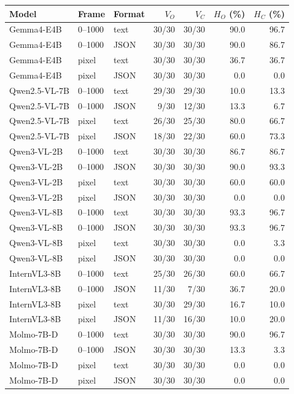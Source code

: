 \begin{tabular}{lllrrrr}
\toprule
Model & Frame & Format & $V_O$ & $V_C$ & $H_O$ (\%) & $H_C$ (\%) \\
\midrule
Gemma4-E4B & 0--1000 & text & 30/30 & 30/30 & 90.0 & 96.7 \\
Gemma4-E4B & 0--1000 & JSON & 30/30 & 30/30 & 90.0 & 86.7 \\
Gemma4-E4B & pixel & text & 30/30 & 30/30 & 36.7 & 36.7 \\
Gemma4-E4B & pixel & JSON & 30/30 & 30/30 & 0.0 & 0.0 \\
Qwen2.5-VL-7B & 0--1000 & text & 29/30 & 29/30 & 10.0 & 13.3 \\
Qwen2.5-VL-7B & 0--1000 & JSON & 9/30 & 12/30 & 13.3 & 6.7 \\
Qwen2.5-VL-7B & pixel & text & 26/30 & 25/30 & 80.0 & 66.7 \\
Qwen2.5-VL-7B & pixel & JSON & 18/30 & 22/30 & 60.0 & 73.3 \\
Qwen3-VL-2B & 0--1000 & text & 30/30 & 30/30 & 86.7 & 86.7 \\
Qwen3-VL-2B & 0--1000 & JSON & 30/30 & 30/30 & 90.0 & 93.3 \\
Qwen3-VL-2B & pixel & text & 30/30 & 30/30 & 60.0 & 60.0 \\
Qwen3-VL-2B & pixel & JSON & 30/30 & 30/30 & 0.0 & 0.0 \\
Qwen3-VL-8B & 0--1000 & text & 30/30 & 30/30 & 93.3 & 96.7 \\
Qwen3-VL-8B & 0--1000 & JSON & 30/30 & 30/30 & 93.3 & 96.7 \\
Qwen3-VL-8B & pixel & text & 30/30 & 30/30 & 0.0 & 3.3 \\
Qwen3-VL-8B & pixel & JSON & 30/30 & 30/30 & 0.0 & 0.0 \\
InternVL3-8B & 0--1000 & text & 25/30 & 26/30 & 60.0 & 66.7 \\
InternVL3-8B & 0--1000 & JSON & 11/30 & 7/30 & 36.7 & 20.0 \\
InternVL3-8B & pixel & text & 30/30 & 29/30 & 16.7 & 10.0 \\
InternVL3-8B & pixel & JSON & 11/30 & 16/30 & 10.0 & 20.0 \\
Molmo-7B-D & 0--1000 & text & 30/30 & 30/30 & 90.0 & 96.7 \\
Molmo-7B-D & 0--1000 & JSON & 30/30 & 30/30 & 13.3 & 3.3 \\
Molmo-7B-D & pixel & text & 30/30 & 30/30 & 0.0 & 0.0 \\
Molmo-7B-D & pixel & JSON & 30/30 & 30/30 & 0.0 & 0.0 \\
\bottomrule
\end{tabular}
